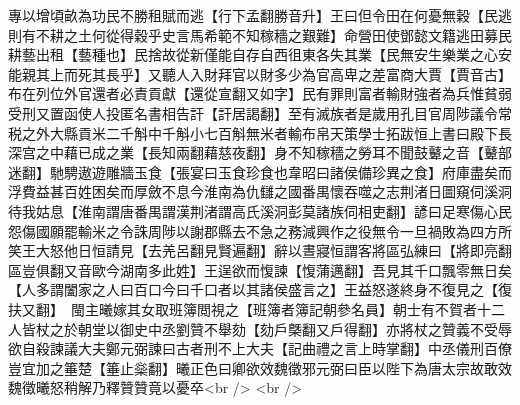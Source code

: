 專以增頃畝為功民不勝租賦而逃【行下孟翻勝音升】王曰但令田在何憂無穀【民逃則有不耕之土何從得穀乎史言馬希範不知稼穡之艱難】命營田使鄧懿文籍逃田募民耕藝出租【藝種也】民捨故從新僅能自存自西徂東各失其業【民無安生樂業之心安能親其上而死其長乎】又聽人入財拜官以財多少為官高卑之差富商大賈【賈音古】布在列位外官還者必責貢獻【還從宣翻又如字】民有罪則富者輸財強者為兵惟貧弱受刑又置函使人投匿名書相告訐【訐居謁翻】至有滅族者是歲用孔目官周陟議令常税之外大縣貢米二千斛中千斛小七百斛無米者輸布帛天策學士拓跋恒上書曰殿下長深宫之中藉已成之業【長知兩翻藉慈夜翻】身不知稼穡之勞耳不聞鼓鼙之音【鼙部迷翻】馳騁遨遊雕牆玉食【張宴曰玉食珍食也韋昭曰諸侯備珍異之食】府庫盡矣而浮費益甚百姓困矣而厚斂不息今淮南為仇讎之國番禺懷吞噬之志荆渚日圖窺伺溪洞待我姑息【淮南謂唐番禺謂漢荆渚謂高氏溪洞彭莫諸族伺相吏翻】諺曰足寒傷心民怨傷國願罷輸米之令誅周陟以謝郡縣去不急之務減興作之役無令一旦禍敗為四方所笑王大怒他日恒請見【去羌呂翻見賢遍翻】辭以晝寢恒謂客將區弘練曰【將即亮翻區豈俱翻又音歐今湖南多此姓】王逞欲而愎諫【愎蒲邁翻】吾見其千口飄零無日矣【人多謂闔家之人曰百口今曰千口者以其諸侯盛言之】王益怒遂終身不復見之【復扶又翻】　閩主曦嫁其女取班簿閲視之【班簿者簿記朝參名員】朝士有不賀者十二人皆杖之於朝堂以御史中丞劉贊不舉劾【劾戶槩翻又戶得翻】亦將杖之贊義不受辱欲自殺諫議大夫鄭元弼諫曰古者刑不上大夫【記曲禮之言上時掌翻】中丞儀刑百僚豈宜加之箠楚【箠止橤翻】曦正色曰卿欲效魏徵邪元弼曰臣以陛下為唐太宗故敢效魏徵曦怒稍解乃釋贊贊竟以憂卒<br />
<br />
